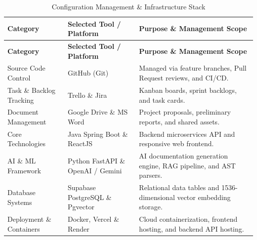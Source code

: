 \begin{footnotesize}
\begin{longtable}{|p{3cm}|p{3.4cm}|p{5.6cm}|}
\caption{Configuration Management \& Infrastructure Stack}\label{tab:config}\\
\hline
\hline
\textbf{Category} & \textbf{Selected Tool / Platform} & \textbf{Purpose \& Management Scope} \\
\hline
\hline
\endfirsthead
\hline
\textbf{Category} & \textbf{Selected Tool / Platform} & \textbf{Purpose \& Management Scope} \\
\hline
\hline
\endhead
Source Code Control & GitHub (Git) & Managed via feature branches, Pull Request reviews, and CI/CD. \\
\hline
Task \& Backlog Tracking & Trello \& Jira & Kanban boards, sprint backlogs, and task cards. \\
\hline
Document Management & Google Drive \& MS Word & Project proposals, preliminary reports, and shared assets. \\
\hline
Core Technologies & Java Spring Boot \& ReactJS & Backend microservices API and responsive web frontend. \\
\hline
AI \& ML Framework & Python FastAPI \& OpenAI / Gemini & AI documentation generation engine, RAG pipeline, and AST parsers. \\
\hline
Database Systems & Supabase PostgreSQL \& Pgvector & Relational data tables and 1536-dimensional vector embedding storage. \\
\hline
Deployment \& Containers & Docker, Vercel \& Render & Cloud containerization, frontend hosting, and backend API hosting. \\
\hline
\hline
\end{longtable}
\end{footnotesize}
